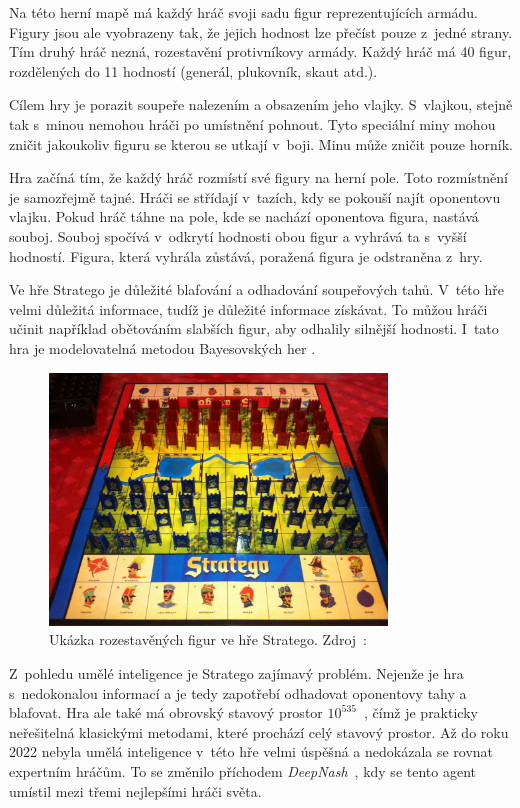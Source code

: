 Na této herní mapě má každý hráč svoji sadu figur reprezentujících armádu.
Figury jsou ale vyobrazeny tak, že jejich hodnost lze přečíst pouze z~jedné strany.
Tím druhý hráč nezná, rozestavění protivníkovy armády.
Každý hráč má 40 figur, rozdělených do 11 hodností (generál, plukovník, skaut atd.).

Cílem hry je porazit soupeře nalezením a obsazením jeho vlajky.
S~vlajkou, stejně tak s~minou nemohou hráči po umístnění pohnout.
Tyto speciální miny mohou zničit jakoukoliv figuru se kterou se utkají v~boji.
Minu může zničit pouze horník.

Hra začíná tím, že každý hráč rozmístí své figury na herní pole.
Toto rozmístnění je samozřejmě tajné.
Hráči se střídají v~tazích, kdy se pokouší najít oponentovu vlajku.
Pokud hráč táhne na pole, kde se nachází oponentova figura, nastává souboj.
Souboj spočívá v~odkrytí hodnosti obou figur a vyhrává ta s~vyšší hodností.
Figura, která vyhrála zůstává, poražená figura je odstraněna z~hry.

Ve hře Stratego je důležité blafování a odhadování soupeřových tahů.
V~této hře velmi důležitá informace, tudíž je důležité informace získávat.
To můžou hráči učinit například obětováním slabších figur, aby odhalily silnější hodnosti.
I~tato hra je modelovatelná metodou Bayesovských her \cite{Bayes_stratego}.

\begin{figure}[H]
	\centering
	\includegraphics[width=0.8\textwidth]{obrazky-figures/stratego}
	\caption{Ukázka rozestavěných figur ve hře Stratego.
  Zdroj~\cite{Stratego_image}:}\label{fig:figure2}
\end{figure}

Z~pohledu umělé inteligence je Stratego zajímavý problém.
Nejenže je hra s~nedokonalou informací a je tedy zapotřebí odhadovat oponentovy tahy a blafovat.
Hra ale také má obrovský stavový prostor $10^{535}$~\cite{Perolat_2022}, čímž je prakticky neřešitelná klasickými metodami, které prochází celý stavový prostor.
Až do roku 2022 nebyla umělá inteligence v~této hře velmi úspěšná a nedokázala se rovnat expertním hráčům.
To se změnilo příchodem \emph{DeepNash}~\cite{Perolat_2022}, kdy se tento agent umístil mezi třemi nejlepšími hráči světa.


